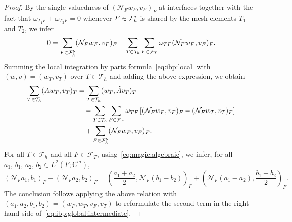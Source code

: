 \documentclass[10pt,a4paper]{amsart}
\newcommand{\Complex}{\mathbb{C}}
\newcommand{\FT}{\mathcal{F}_T}
\newcommand{\Fhb}{\mathcal{F}_h^{\rm b}}
\newcommand{\Fhi}{\mathcal{F}_h^{\rm i}}
\newcommand{\Th}{\mathcal{T}_h}
\begin{document}
\begin{proof}
  By the single-valuedness of $(\mathcal{N}_F w_F, v_F)_F$ at interfaces together with the fact that $\omega_{T_1F} + \omega_{T_2F} = 0$ whenever $F \in \Fhi$ is shared by the mesh elements $T_1$ and $T_2$, we infer
  \[
  0 = \sum_{F \in \Fhb} (\mathcal{N}_F w_F, v_F)_F
  - \sum_{T \in \Th} \sum_{F \in \FT} \omega_{TF} (\mathcal{N}_F w_F, v_F)_F.
  \]
  Summing the local integration by parts formula~\eqref{eq:ibp:local} with $(w,v) = (w_T, v_T)$ over $T \in \Th$ and adding the above expression, we obtain
  \begin{equation}\label{eq:ibp:global:intermediate}
    \begin{aligned}
      \sum_{T \in \Th} (A w_T, v_T)_T
      &= \sum_{T \in \Th} (w_T, \tilde{A} v_T)_T
      \\
      &\quad
      - \sum_{T \in \Th} \sum_{F \in \FT} \omega_{TF} \left[
        (\mathcal{N}_F w_F, v_F)_F
        - (\mathcal{N}_F w_T, v_T)_F
        \right]
      \\
      &\quad
      + \sum_{F \in \Fhb} (\mathcal{N}_F w_F, v_F)_F.
    \end{aligned}
  \end{equation}
  For all $T \in \Th$ and all $F \in \FT$, using~\eqref{eq:magic:algebraic}, we infer, for all $a_1,\,b_1,\,a_2,\,b_2 \in L^2(F;\Complex^m)$,
  \begin{equation}\label{eq:magic.formula}
    (\mathcal{N}_F a_1, b_1)_F
    - (\mathcal{N}_F a_2, b_2)_F
    = \left(\frac{a_1 + a_2}{2}, \mathcal{N}_F (b_1 - b_2)\right)_F
    + \left(\mathcal{N}_F (a_1 - a_2), \frac{b_1 + b_2}{2}\right)_F.
  \end{equation}
  The conclusion follows applying the above relation with $(a_1,a_2,b_1,b_2) = (w_F, w_T, v_F, v_T)$ to reformulate the second term in the right-hand side of~\eqref{eq:ibp:global:intermediate}.
\end{proof}
\end{document}

